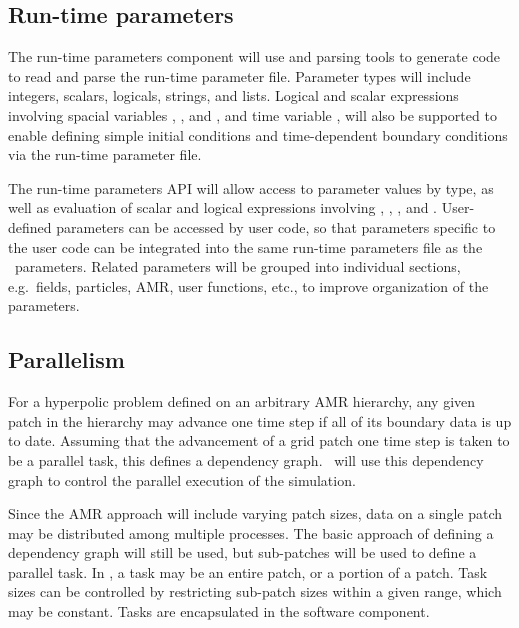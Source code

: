 \documentclass[10pt,twocolumn]{article}
\begin{document}
\subsection{Run-time parameters} \label{ss:design-parameters}

The run-time parameters component will use  and
 parsing tools to generate code to read and parse the
run-time parameter file.  Parameter types will include integers,
scalars, logicals, strings, and lists.  Logical and scalar expressions
involving spacial variables , , and , and time
variable , will also be supported to enable defining simple
initial conditions and time-dependent boundary conditions via the
run-time parameter file.

The run-time parameters API will allow access to parameter values by
type, as well as evaluation of scalar and logical expressions
involving , , , and .  User-defined
parameters can be accessed by user code, so that parameters specific
to the user code can be integrated into the same run-time parameters
file as the \cello\ parameters.  Related parameters will be grouped
into individual sections, e.g.~fields, particles, AMR, user functions,
etc., to improve organization of the parameters.

\subsection{Parallelism} \label{ss:design-parallel}

For a hyperpolic problem defined on an arbitrary AMR hierarchy, any
given patch in the hierarchy may advance one time step if all of its
boundary data is up to date.  Assuming that the advancement of a grid
patch one time step is taken to be a parallel task, this defines a
dependency graph.  \cello\ will use this dependency graph to control
the parallel execution of the simulation.

Since the AMR approach will include varying patch sizes, data on a
single patch may be distributed among multiple processes.  The basic
approach of defining a dependency graph will still be used, but
sub-patches will be used to define a parallel task.  In \cello, a task
may be an entire patch, or a portion of a patch.  Task sizes can be
controlled by restricting sub-patch sizes within a given range, which
may be constant.  Tasks are encapsulated in the  software
component.
\end{document}
